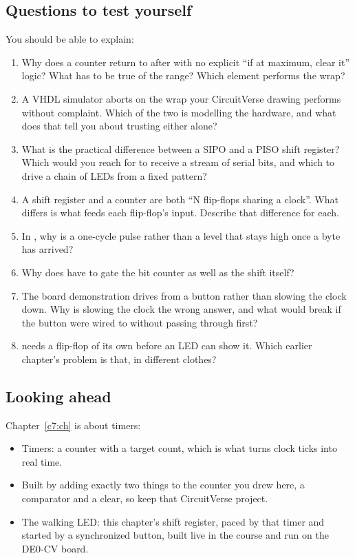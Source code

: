 \subsection*{Questions to test yourself}
You should be able to explain:
\begin{enumerate}
  \item Why does a  counter return to  after  with no
    explicit ``if at maximum, clear it'' logic? What has to be true of the range? Which element
    performs the wrap?
  \item A VHDL simulator aborts on the wrap your CircuitVerse drawing performs without complaint.
    Which of the two is modelling the hardware, and what does that tell you about trusting either
    alone?
  \item What is the practical difference between a SIPO and a PISO shift register? Which would you
    reach for to receive a stream of serial bits, and which to drive a chain of LEDs from a fixed
    pattern?
  \item A shift register and a counter are both ``N flip-flops sharing a clock''. What differs is
    what feeds each flip-flop's input. Describe that difference for each.
  \item In , why is  a one-cycle pulse rather than a level that
    stays high once a byte has arrived?
  \item Why does  have to gate the bit counter as well as the shift itself?
  \item The board demonstration drives  from a button rather than slowing the
    clock down. Why is slowing the clock the wrong answer, and what would break if the button were
    wired to  without passing through  first?
  \item {} needs a flip-flop of its own before an LED can show it. Which earlier
    chapter's problem is that, in different clothes?
\end{enumerate}

\subsection*{Looking ahead}
Chapter~\ref{c7:ch} is about timers:
\begin{itemize}
  \item Timers: a counter with a target count, which is what turns clock ticks into real time.
  \item Built by adding exactly two things to the counter you drew here, a comparator and a clear,
    so keep that CircuitVerse project.
  \item The walking LED: this chapter's shift register, paced by that timer and started by a
    synchronized button, built live in the course and run on the DE0-CV board.
\end{itemize}
